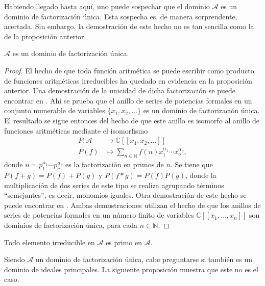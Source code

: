 Habiendo llegado hasta aquí, uno puede sospechar que el dominio $\mathcal{A}$ es un dominio de factorización única. Esta sospecha es, de manera sorprendente, acertada. Sin embargo, la demostración de este hecho no es tan sencilla como la de la proposición anterior.

\begin{theorem}
$\mathcal{A}$ es un dominio de factorización única.
\end{theorem}
\begin{proof}
El hecho de que toda función aritmética se puede escribir como producto de funciones aritméticas irreducibles ha quedado en evidencia en la proposición anterior. Una demostración de la unicidad de dicha factorización se puede encontrar en \cite[18, p. 985]{Ca1959}. Ahí se prueba que el anillo de series de potencias formales en un conjunto numerable de variables $\{ x_1,x_2,\ldots \}$ es un dominio de factorización única. El resultado se sigue entonces del hecho de que este anillo es isomorfo al anillo de funciones aritméticas mediante el isomorfismo
\begin{align*}
    P : \mathcal{A} & \longrightarrow \mathbb{C}[[x_1,x_2,\ldots]] \\
    P(f) & \longmapsto \sum_{n \in \mathbb{N}} f(n) x_1^{\alpha_1}\cdots x_{\nu}^{\alpha_{\nu}},
\end{align*}
donde $n=p_1^{\alpha_1}\cdots p_{\nu}^{\alpha_{\nu}}$ es la factorización en primos de $n$. Se tiene que $P(f+g)=P(f)+P(g)$ y $P(f*g)=P(f)P(g)$, donde la multiplicación de dos series de este tipo se realiza agrupando términos ``semejantes'', es decir, monomios iguales. Otra demostración de este hecho se puede encontrar en \cite{Nish1}. Ambas demostraciones utilizan el hecho de que los anillos de series de potencias formales en un número finito de variables $\mathbb{C}[[x_1,\ldots,x_n]]$ son dominios de factorización única, para cada $n \in \mathbb{N}$.
\end{proof}

\begin{corollary}\label{cor:fac1}
Todo elemento irreducible en $\mathcal{A}$ es primo en $\mathcal{A}$.
\end{corollary}

Siendo $\mathcal{A}$ un dominio de factorización única, cabe preguntarse si también es un dominio de ideales principales. La siguiente proposición muestra que este no es el caso.

